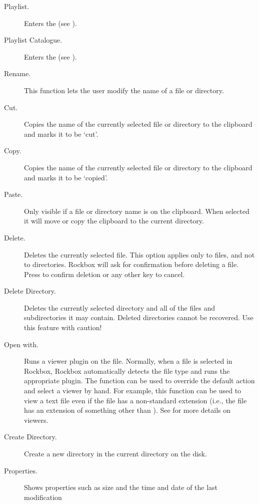 \begin{description}
\item [Playlist.]
  Enters the  (see ).
\item [Playlist Catalogue.]
  Enters the  (see 
  ).
\item [Rename.]
  This function lets the user modify the name of a file or directory.
\item [Cut.]
  Copies the name of the currently selected file or directory to the clipboard
  and marks it to be `cut'.
\item [Copy.]
  Copies the name of the currently selected file or directory to the clipboard
  and marks it to be `copied'.
\item [Paste.]
  Only visible if a file or directory name is on the clipboard. When selected
  it will move or copy the clipboard to the current directory.
\item [Delete.]
  Deletes the currently selected file. This option applies only to files, and
  not to directories. Rockbox will ask for confirmation before deleting a file.
  Press \ActionYesNoAccept{}
  to confirm deletion or any other key to cancel.
\item [Delete Directory.]
  Deletes the currently selected directory and all of the files and subdirectories
  it may contain. Deleted directories cannot be recovered. Use this feature with
  caution!
\item [Open with.]
  Runs a viewer plugin on the file. Normally, when a file is selected in Rockbox,
  Rockbox automatically detects the file type and runs the appropriate plugin.
  The  function can be used to override the default action and
  select a viewer by hand.
  For example, this function can be used to view a text file
  even if the file has a non-standard extension (i.e., the file has an extension
  of something other than ). See 
  for more details on viewers.
\item [Create Directory.]
  Create a new directory in the current directory on the disk.
\item [Properties.]
  Shows properties such as size and the time and date of the last modification

\end{description}

